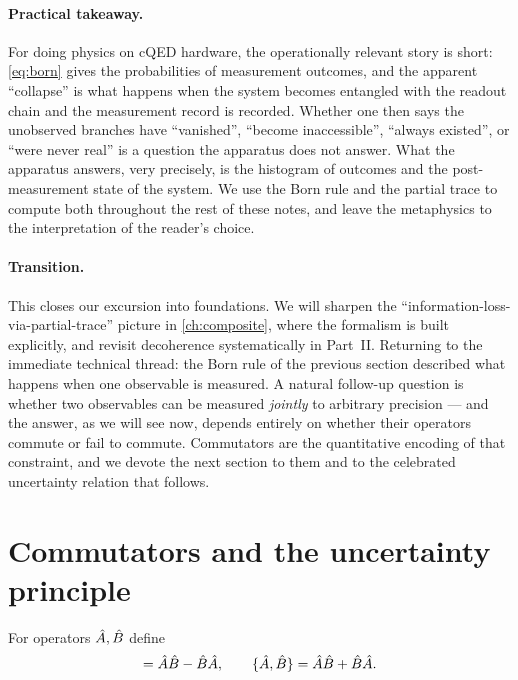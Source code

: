 \paragraph{Practical takeaway.}
For doing physics on cQED hardware, the operationally relevant
story is short: \cref{eq:born} gives the probabilities of
measurement outcomes, and the apparent ``collapse'' is what
happens when the system becomes entangled with the readout chain
and the measurement record is recorded. Whether one then says the
unobserved branches have ``vanished'', ``become inaccessible'',
``always existed'', or ``were never real'' is a question the
apparatus does not answer. What the apparatus answers, very
precisely, is the histogram of outcomes and the post-measurement
state of the system. We use the Born rule and the partial trace to
compute both throughout the rest of these notes, and leave the
metaphysics to the interpretation of the reader's choice.

\paragraph{Transition.}
This closes our excursion into foundations. We will sharpen the
``information-loss-via-partial-trace'' picture in
\cref{ch:composite}, where the formalism is built explicitly, and
revisit decoherence systematically in Part~II. Returning to the
immediate technical thread: the Born rule of the previous section
described what happens when one observable is measured. A natural
follow-up question is whether two observables can be measured
\emph{jointly} to arbitrary precision --- and the answer, as we
will see now, depends entirely on whether their operators commute
or fail to commute. Commutators are the quantitative encoding of
that constraint, and we devote the next section to them and to the
celebrated uncertainty relation that follows.

\section{Commutators and the uncertainty principle}
\label{sec:uncertainty}

\begin{definition}
For operators $\hat{A},\hat{B}$ define
\begin{equation}
[\op{A},\op{B}] = \op{A}\op{B}-\op{B}\op{A},
\qquad
\{\op{A},\op{B}\} = \op{A}\op{B}+\op{B}\op{A}.
\end{equation}
\end{definition}

